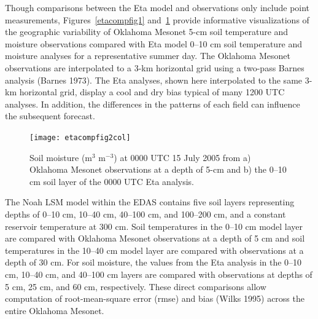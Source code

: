\documentclass[twocolumn]{article}
\begin{document}
Though comparisons between the Eta model and observations only include point measurements, Figures~\ref{etacompfig1} and~\ref{etacompfig2} provide informative visualizations of the geographic variability of Oklahoma Mesonet 5-cm soil temperature and moisture observations compared with Eta model 0--10 cm soil temperature and moisture analyses for a representative summer day.  The Oklahoma Mesonet observations are interpolated to a 3-km horizontal grid using a two-pass Barnes analysis (Barnes 1973).  The Eta analyses, shown here interpolated to the same 3-km horizontal grid, display a cool and dry bias typical of many 1200 UTC analyses.  In addition, the differences in the patterns of each field can influence the subsequent forecast.
\begin{figure}[!t] %
\begin{center}
\texttt{[image: etacompfig2col]}
\end{center}
\caption{
Soil moisture (m$^3$ m$^{-3}$) at 0000 UTC 15 July 2005 from a) Oklahoma Mesonet observations
at a depth of 5-cm and b) the 0--10 cm soil layer of the 0000 UTC Eta
analysis.
\label{etacompfig2}
}
\end{figure}

The Noah LSM model within the EDAS contains five soil layers representing depths of 0--10 cm, 10--40 cm, 40--100 cm, and 100--200 cm, and a constant reservoir temperature at 300 cm.  Soil temperatures in the 0--10 cm model layer are compared with Oklahoma Mesonet observations at a depth of 5 cm and soil temperatures in the 10--40 cm model layer are compared with observations at a depth of 30 cm.  For soil moisture, the values from the Eta analysis in the 0--10 cm, 10--40 cm, and 40--100 cm layers are compared with observations at depths of 5 cm, 25 cm, and 60 cm, respectively.  These direct comparisons allow computation of root-mean-square error (rmse) and bias (Wilks 1995) across the entire Oklahoma Mesonet.
\end{document}
